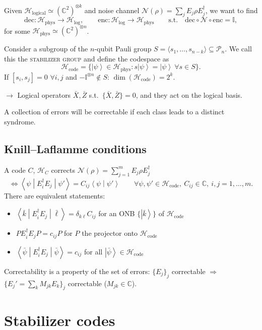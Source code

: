 \documentclass[11pt,a4paper]{article}
\renewcommand{\ket}[1]{\left|#1\right\rangle}
\renewcommand{\braket}[2]{\left\langle#1\middle|#2\right\rangle}
\newcommand{\expval}[3]{\left\langle#1\middle|#2\middle|#3\right\rangle}
\newcommand{\Hil}{\mathcal{H}}
\newcommand{\CC}{\mathbb{C}}
\newcommand{\id}{\mathbb{I}}
\begin{document}
Given $\Hil_{\text{logical}}\simeq(\CC^2)^{\otimes k}$ and noise channel $\mathcal N(\rho) = \sum_jE_j\rho E_j^\dagger$, we want to find
\[
\text{dec}: \Hil_{\text{phys}}\to\Hil_{\text{log}},\qquad \text{enc}: \Hil_{\text{log}}\to\Hil_{\text{phys}}\qquad\text{s.t.}\quad \text{dec}\circ\mathcal N\circ\text{enc} = \id,
\]
for some $\Hil_{\text{phys}}\simeq(\CC^2)^{\otimes n}$.

Consider a subgroup of the $n$-qubit Pauli group $S = \langle s_1,\dots,s_{n-k}\rangle\subseteq\mathcal P_n$. We call this the \textsc{stabilizer group} and define the codespace as
\[
\Hil_{\text{code}} = \bigl\{\ket\psi\in\Hil_{\text{phys}} : s\ket\psi = \ket\psi\ \forall s\in S\bigr\}.
\]
If $[s_i,s_j] = 0$ $\forall i,j$ and $-\id^{\otimes n}\notin S$: $\dim(\Hil_{\text{code}}) = 2^k$.

$\to$ Logical operators $\bar X,\bar Z$ s.t.\ $\{\bar X,\bar Z\} = 0$, and they act on the logical basis.

A collection of errors will be correctable if each class leads to a distinct syndrome.

\subsection{Knill--Laflamme conditions}

A code $C$, $\Hil_C$ corrects $\mathcal N(\rho) = \sum_{j=1}^mE_j\rho E_j^\dagger$
\[
\iff \expval{\psi}{E_i^\dagger E_j}{\psi'} = C_{ij}\braket{\psi}{\psi'}\qquad\forall\psi,\psi'\in\Hil_{\text{code}},\ C_{ij}\in\CC,\ i,j = 1,\dots,m.
\]
There are equivalent statements:
\begin{itemize}
  \item $\expval{\bar k}{E_i^\dagger E_j}{\bar\ell} = \delta_{k\ell}C_{ij}$ for an ONB $\{\ket{\bar k}\}$ of $\Hil_{\text{code}}$
  \item $PE_i^\dagger E_jP = c_{ij}P$ for $P$ the projector onto $\Hil_{\text{code}}$
  \item $\expval{\bar\psi}{E_i^\dagger E_j}{\bar\psi} = c_{ij}$ for all $\ket{\bar\psi}\in\Hil_{\text{code}}$
\end{itemize}
Correctability is a property of the set of errors: $\{E_j\}_j$ correctable $\Rightarrow$ $\bigl\{E_j' = \sum_kM_{jk}E_k\bigr\}_j$ correctable ($M_{jk}\in\CC$).

\section{Stabilizer codes}
\end{document}
